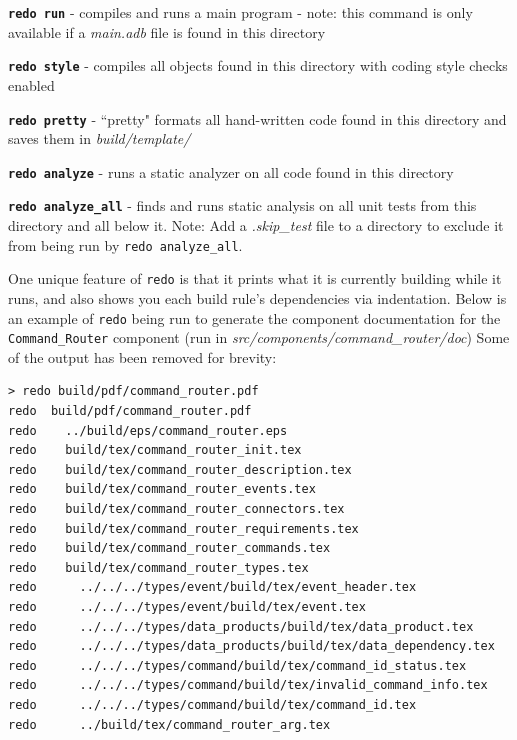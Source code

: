 \begin{spaceditemize}
  \item \textbf{\texttt{redo run}} - compiles and runs a main program - note: this command is only available if a \textit{main.adb} file is found in this directory
  \item \textbf{\texttt{redo style}} - compiles all objects found in this directory with coding style checks enabled
  \item \textbf{\texttt{redo pretty}} - ``pretty" formats all hand-written code found in this directory and saves them in \textit{build/template/}
  \item \textbf{\texttt{redo analyze}} - runs a static analyzer on all code found in this directory
  \item \textbf{\texttt{redo analyze\_all}} - finds and runs static analysis on all unit tests from this directory and all below it. Note: Add a \textit{.skip\_test} file to a directory to exclude it from being run by \texttt{redo analyze\_all}.
\end{spaceditemize}
\vspace{5mm} %

One unique feature of \texttt{redo} is that it prints what it is currently building while it runs, and also shows you each build rule's dependencies via indentation. Below is an example of \texttt{redo} being run to generate the component documentation for the \texttt{Command\_Router} component (run in \textit{src/components/command\_router/doc}) Some of the output has been removed for brevity:

\vspace{5mm} %
\begin{verbatim}
> redo build/pdf/command_router.pdf
redo  build/pdf/command_router.pdf
redo    ../build/eps/command_router.eps
redo    build/tex/command_router_init.tex
redo    build/tex/command_router_description.tex
redo    build/tex/command_router_events.tex
redo    build/tex/command_router_connectors.tex
redo    build/tex/command_router_requirements.tex
redo    build/tex/command_router_commands.tex
redo    build/tex/command_router_types.tex
redo      ../../../types/event/build/tex/event_header.tex
redo      ../../../types/event/build/tex/event.tex
redo      ../../../types/data_products/build/tex/data_product.tex
redo      ../../../types/data_products/build/tex/data_dependency.tex
redo      ../../../types/command/build/tex/command_id_status.tex
redo      ../../../types/command/build/tex/invalid_command_info.tex
redo      ../../../types/command/build/tex/command_id.tex
redo      ../build/tex/command_router_arg.tex
\end{verbatim}
\vspace{5mm} %

